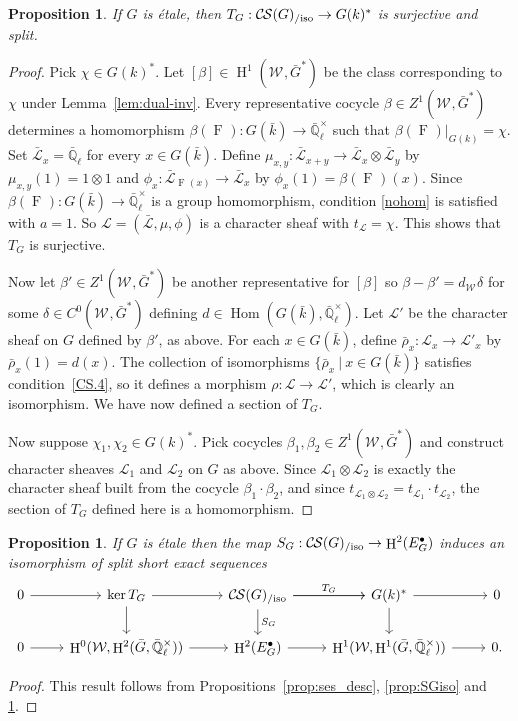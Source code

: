 \documentclass[10pt]{amsart}
\theoremstyle{plain}
\newtheorem{proposition}[theorem]{Proposition}
\theoremstyle{definition}
\newcommand{\EE}{\mathbb{\bar Q}_\ell}
\newcommand{\bFq}{\bar{k}}
\newcommand{\Fq}{k}
\newcommand{\EEx}{\EE^\times}
\newcommand{\Weil}[1]{\mathcal{W}_{#1}}
\newcommand{\Frob}[1]{\operatorname{F}_{#1}}
\DeclareMathOperator{\Hom}{Hom}
\DeclareMathOperator{\Hh}{H}
\newcommand{\tq}{{\ \vert\ }}
\newcommand{\trFrob}[1]{t_{#1}}
\newcommand{\TrFrob}[1]{T_{#1}}
\newcommand{\cs}[1]{{\mathcal{#1}}}
\newcommand{\gcs}[1]{{\mathcal{\bar #1}}}
\newcommand{\CS}{{\mathcal{C\hskip-0.8pt S}}}
\newcommand{\CSiso}[1]{\CS(#1)_{/\text{iso}}}
\newcommand{\bG}{\bar{G}}
\newcommand{\brho}{{\bar\rho}}
\begin{document}
\begin{proposition}\label{prop:sur_etale}
If $G$ is \'etale, then $\TrFrob{G} : \CSiso{G} \to G(\Fq)^*$ is surjective
and split.
\end{proposition}
\begin{proof}
Pick $\chi \in G(\Fq)^*$. 
Let $[\beta]\in \Hh^1(\Weil{},\bG^*)$ be the class corresponding to $\chi$ under Lemma~\ref{lem:dual-inv}.
Every representative cocycle $\beta \in Z^1(\Weil{},\bG^*)$ determines a homomorphism $\beta(\Frob{}) : G(\bFq)\to \EEx$ such that $\beta(\Frob{})\vert_{G(\Fq)} = \chi$.
Set $\gcs{L}_x = \EE$ for every $x\in G(\bFq)$.
Define $\mu_{x,y} : \gcs{L}_{x+y} \to \gcs{L}_x\otimes \gcs{L}_y$ by $\mu_{x,y}(1) = 1 \otimes 1$ and
$\phi_{x} : \gcs{L}_{\Frob{}(x)} \to \gcs{L}_x$ by $\phi_{x}(1) = \beta(\Frob{})(x)$.
Since $\beta(\Frob{}) : G(\bFq) \to \EEx$ is a group homomorphism,
condition \eqref{nohom} is satisfied with $a =1$.
So $\cs{L} = (\gcs{L}, \mu, \phi)$
is a character sheaf with $\trFrob{\cs{L}} = \chi$.
This shows that $\TrFrob{G}$ is surjective.

Now let $\beta' \in Z^1(\Weil{},\bG^*)$ be another representative for $[\beta]$
so $\beta-\beta' = d_{\Weil{}} \delta$ for some $\delta \in C^0(\Weil{},\bG^*)$ defining $d \in \Hom(G(\bFq),\EEx)$.
Let $\cs{L}'$ be the character sheaf on $G$ defined by $\beta'$, as above.
For each $x\in G(\bFq)$, define $\brho_x :\cs{L}_x\to \cs{L}'_x$ by $\brho_x(1) = d(x)$.
The collection of isomorphisms $\{ \brho_x \tq x\in G(\bFq)\}$ satisfies condition~\ref{CS.4}, so it defines a morphism $\rho : \cs{L}\to \cs{L}'$, which is clearly an isomorphism. 
%
We have now defined a section of $\TrFrob{G}$. 

Now suppose $\chi_1, \chi_2 \in G(\Fq)^*$. Pick cocycles $\beta_1,\beta_2\in Z^1(\Weil{},\bG^*)$ and construct character sheaves $\cs{L}_1$ and $\cs{L}_2$ on $G$ as above. Since $\cs{L}_1\otimes \cs{L}_2$ is exactly the character sheaf built from the cocycle $\beta_1\cdot \beta_2$, and since $\trFrob{\cs{L}_1\otimes \cs{L}_2} = \trFrob{\cs{L}_1}\cdot \trFrob{\cs{L}_2}$, the section of $\TrFrob{G}$ defined here is a homomorphism.
\end{proof}

\begin{proposition} \label{prop:etale-iso}
 If $G$ is \'etale then the map $S_G : \CSiso{G}\to \Hh^2(E^\bullet_G)$ induces an isomorphism of split short exact sequences
\[
\begin{tikzcd}
 0 \arrow{r} & \ker \TrFrob{G} \arrow{d} \arrow{r} & \CSiso{G}\arrow{d}{S_G} \arrow{r}{\TrFrob{G}} \arrow{r} & G(\Fq)^* \arrow{d} \arrow{r} & 0\\
  0 \arrow{r} & \Hh^0(\Weil{},\Hh^2(\bG,\EEx)) \arrow{r} & \Hh^2(E^\bullet_G) \arrow{r} & \Hh^1(\Weil{},\Hh^1(\bG,\EEx)) \arrow{r} & 0.
 \end{tikzcd}
 \]
\end{proposition}
\begin{proof}
This result follows from Propositions~\ref{prop:ses_desc}, \ref{prop:SGiso} and \ref{prop:sur_etale}.
\end{proof}
\end{document}
